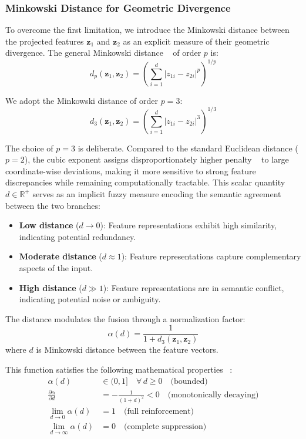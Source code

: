 \documentclass[12pt]{article}
\begin{document}
\subsubsection{Minkowski Distance for Geometric Divergence}

To overcome the first limitation, we introduce the Minkowski distance between the projected features $\mathbf{z}_1$ and $\mathbf{z}_2$ as an explicit measure of their geometric divergence. The general Minkowski distance ~\cite{b9} of order $p$ is:
\begin{equation*}
    d_p(\mathbf{z}_1, \mathbf{z}_2) = \left( \sum_{i=1}^{d} |z_{1i} - z_{2i}|^p \right)^{1/p}
\end{equation*}

We adopt the Minkowski distance of order $p = 3$:
\begin{equation*}
    d_3(\mathbf{z}_1, \mathbf{z}_2) = \left( \sum_{i=1}^{d} |z_{1i} - z_{2i}|^3 \right)^{1/3}
\end{equation*}

The choice of $p=3$ is deliberate. Compared to the standard Euclidean distance ($p=2$), the cubic exponent assigns disproportionately higher penalty ~\cite{b10} to large coordinate-wise deviations, making it more sensitive to strong feature discrepancies while remaining computationally tractable. This scalar quantity $d \in \mathbb{R}^+$ serves as an implicit fuzzy measure encoding the semantic agreement between the two branches:

\begin{itemize}
    \item \textbf{Low distance} ($d \rightarrow 0$): Feature representations exhibit high similarity, indicating potential redundancy.
    \item \textbf{Moderate distance} ($d \approx 1$): Feature representations capture complementary aspects of the input.
    \item \textbf{High distance} ($d \gg 1$): Feature representations are in semantic conflict, indicating potential noise or ambiguity.
\end{itemize}

The distance modulates the fusion through a normalization factor:
\begin{equation*}
    \alpha(d) = \frac{1}{1 + d_3(\mathbf{z}_1, \mathbf{z}_2)}
\end{equation*}
where $d$ is Minkowski distance between the feature vectors.

This function satisfies the following mathematical properties ~\cite{b32}: 
\begin{align*}
    \alpha(d) &\in (0, 1] \quad \forall \, d \geq 0 \quad \text{(bounded)} \\
    \frac{\partial \alpha}{\partial d} &= -\frac{1}{(1+d)^2} < 0 \quad \text{(monotonically decaying)} \\
    \lim_{d \to 0} \alpha(d) &= 1 \quad \text{(full reinforcement)} \\
    \lim_{d \to \infty} \alpha(d) &= 0 \quad \text{(complete suppression)}
\end{align*}
\end{document}
